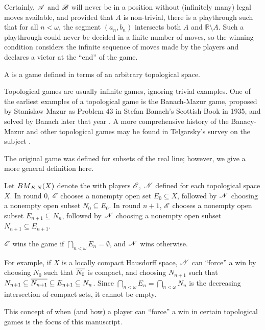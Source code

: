 Certainly, $\mathscr{A}$ and $\mathscr{B}$ will never be in
a position without (infinitely many) legal moves available, and provided that
$A$ is non-trivial, there is a playthrough such that for all $n<\omega$,
the segment $(a_n,b_n)$ intersects both $A$ and $\mathbb{R}\setminus A$.
Such a playthrough could never be decided in a finite number of moves,
so the winning condition considers the infinite sequence of moves made by the
players and declares a victor at the ``end'' of the game.

\begin{defn}
  A  is a game defined in terms of an arbitrary
  topological space.
\end{defn}

Topological games are usually infinite games, ignoring trivial examples.
One of the earliest examples
of a topological game is the Banach-Mazur game, proposed by Stanislaw Mazur
as Problem 43 in Stefan Banach's Scottish Book in 1935, and solved by
Banach later that year \cite{MR666400}. A more comprehensive
history of the Banacy-Mazur and other topological games may be found in
Telgarsky's survey on the subject \cite{MR892457}.

The original game was defined for subsets of the real line; however,
we give a more general definition here.

\begin{game}
  Let ${BM}_{E,N}(X)$ denote the  with players $\mathscr{E}$,
  $\mathscr{N}$ defined for each topological space $X$.
  In round $0$, $\mathscr{E}$ chooses a nonempty open set $E_0\subseteq X$, followed
  by $\mathscr{N}$ choosing a nonempty open subset $N_0\subseteq E_0$.
  In round $n+1$, $\mathscr{E}$ chooses a nonempty open subset $E_{n+1}\subseteq N_n$,
  followed by $\mathscr{N}$ choosing a nonempty open subset
  $N_{n+1}\subseteq E_{n+1}$.

  $\mathscr{E}$ wins the game if $\bigcap_{n<\omega} E_n = \emptyset$,
  and $\mathscr{N}$ wins otherwise.
\end{game}

For example, if $X$ is a locally compact Hausdorff space, $\mathscr{N}$ can ``force''
a win by choosing $N_0$ such that $\overline{N_0}$ is compact, and choosing
$N_{n+1}$ such that
$N_{n+1}\subseteq\overline{N_{n+1}}\subseteq E_{n+1}\subseteq N_n$.
Since $\bigcap_{n<\omega} E_n = \bigcap_{n<\omega} N_n$ is the decreasing
intersection of compact sets, it cannot be empty.

This concept of when (and how) a player can ``force'' a win in certain
topological games is the focus of this manuscript.



